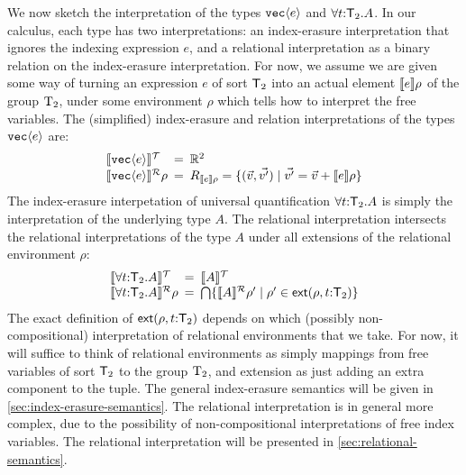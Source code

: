 We now sketch the interpretation of the types $\texttt{vec}\langle e \rangle$ and
$\forall t\mathord:\mathsf{T}_2.A$. In our calculus, each type has two
interpretations: an index-erasure interpretation that ignores the
indexing expression $e$, and a relational interpretation as a binary
relation on the index-erasure interpretation. For now, we assume we
are given some way of turning an expression $e$ of sort $\mathsf{T}_2$
into an actual element $\llbracket e \rrbracket\rho$ of the group $\mathrm{T}_2$, under
some environment $\rho$ which tells how to interpret the free
variables. The (simplified) index-erasure and relation interpretations
of the types $\texttt{vec}\langle e \rangle$ are:
\begin{displaymath}
  \begin{array}{l@{\hspace{0.5em}=\hspace{0.5em}}l}
    \tySem{\tyPrim{vec}{e}} & \mathbb{R}^2 \\
    \rsem{\tyPrim{vec}{e}}{}\rho & R_{\sem{e}\rho} = \{ (\vec{v},\vec{v'}) \sepbar \vec{v'} = \vec{v} + \sem{e}\rho \}
  \end{array}
\end{displaymath}
The index-erasure interpetation of universal quantification $\forall
t\mathord:\mathsf{T}_2.A$ is simply the interpretation of the
underlying type $A$. The relational interpretation intersects the
relational interpretations of the type $A$ under all extensions of the
relational environment $\rho$:
\begin{displaymath}
  \begin{array}{l@{\hspace{0.5em}=\hspace{0.5em}}l}
    \tySem{\forall t\mathord:\SynTransl_2.A} & \tySem{A} \\
    \rsem{\forall t\mathord:\SynTransl_2.A}{}\rho & \bigcap\{ \rsem{A}{}{\rho'} \sepbar \rho' \in \extends{\rho}{t\mathord:\SynTransl_2} \}
  \end{array}
\end{displaymath}
The exact definition of $\mathsf{ext}(\rho,t\mathord:\mathsf{T}_2)$
depends on which (possibly non-compositional) interpretation of
relational environments that we take. For now, it will suffice to
think of relational environments as simply mappings from free
variables of sort $\mathsf{T}_2$ to the group $\mathrm{T}_2$, and
extension as just adding an extra component to the tuple. The general
index-erasure semantics will be given in
\autoref{sec:index-erasure-semantics}. The relational interpretation
is in general more complex, due to the possibility of
non-compositional interpretations of free index variables. The
relational interpretation will be presented in
\autoref{sec:relational-semantics}.

